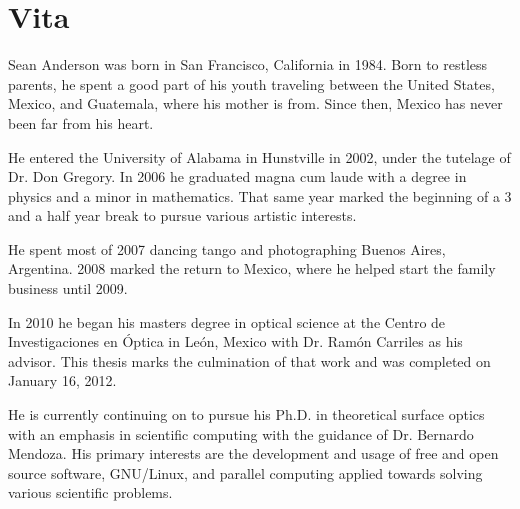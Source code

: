 \chapter{Vita}
Sean Anderson was born in San Francisco, California in 1984. Born to restless parents, he spent a good part of his youth traveling between the United States, Mexico, and Guatemala, where his mother is from. Since then, Mexico has never been far from his heart.

He entered the University of Alabama in Hunstville in 2002, under the tutelage of Dr. Don Gregory. In 2006 he graduated magna cum laude with a degree in physics and a minor in mathematics. That same year marked the beginning of a 3 and a half year break to pursue various artistic interests.

He spent most of 2007 dancing tango and photographing Buenos Aires, Argentina. 2008 marked the return to Mexico, where he helped start the family business until 2009.

In 2010 he began his masters degree in optical science at the Centro de Investigaciones en \'Optica in Le\'on, Mexico with Dr. Ram\'on Carriles as his advisor. This thesis marks the culmination of that work and was completed on January 16, 2012.

He is currently continuing on to pursue his Ph.D. in theoretical surface optics with an emphasis in scientific computing with the guidance of Dr. Bernardo Mendoza. His primary interests are the development and usage of free and open source software, GNU/Linux, and parallel computing applied towards solving various scientific problems.
\clearpage
\thispagestyle{empty}
